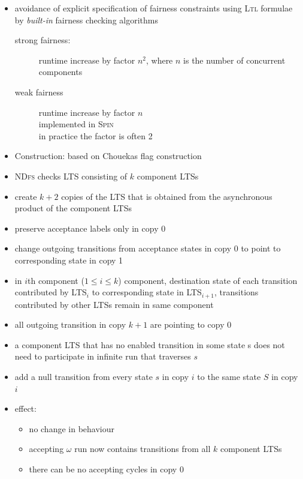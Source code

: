 \documentclass[a4paper, 10pt]{article}
\begin{document}
\begin{itemize}
    \item avoidance of explicit specification of fairness constraints using \textsc{Ltl} formulae by \emph{built-in} fairness checking algorithms
    \begin{description}
        \item[strong fairness:] runtime increase by factor $n^2$, where $n$ is the number of concurrent components
        \item[weak fairness] runtime increase by factor $n$\\
        implemented in \textsc{Spin} \\
        in practice the factor is often 2
    \end{description}
    \item Construction: based on Chouekas flag construction
    \item \textsc{NDfs} checks LTS consisting of $k$ component LTSs
    \item create $k+2$ copies of the LTS that is obtained from the asynchronous product of the component LTSs
    \item preserve acceptance labels only in copy 0
    \item change outgoing transitions from acceptance states in copy 0 to point to corresponding state in copy 1
    \item in $i$th component ($1\leq i \leq k$) component, destination state of each transition contributed by LTS$_i$ to corresponding state in LTS$_{i+1}$, transitions contributed by other LTSs remain in same component
    \item all outgoing transition in copy $k+1$ are pointing to copy 0
    \item a component LTS that has no enabled transition in some state s does not need to participate in infinite run that traverses $s$
    \item add a null transition from every state $s$ in copy $i$ to the same state $S$ in copy $i$
    \begin{center}
    \scalebox{.75}{}
    \end{center}
    \item effect:
    \begin{itemize}
        \item no change in behaviour
        \item accepting $\omega$ run now contains transitions from all $k$ component LTSs
        \item there can be no accepting cycles in copy 0

\end{itemize}
\end{itemize}
\end{document}
